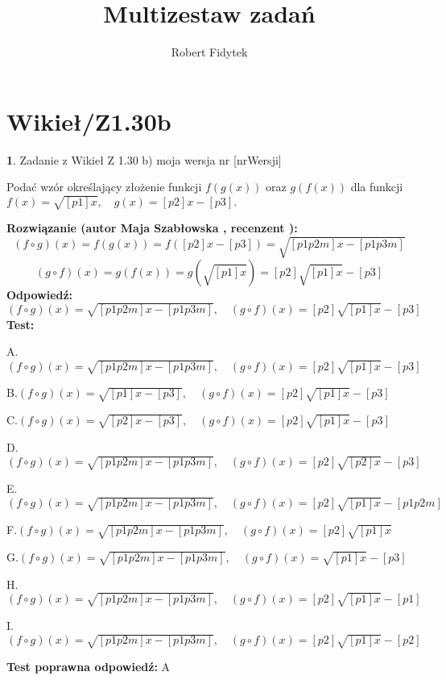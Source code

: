 \documentclass[12pt, a4paper]{article}
\title{Multizestaw zadań}
\author{Robert Fidytek}
\date{}
\theoremstyle{definition} %
\newtheorem{zad}{}
\newcommand{\kategoria}[1]{\section{#1}} %
\newcommand{\zadStart}[1]{\begin{zad}#1\newline} %
\newcommand{\zadStop}{\end{zad}}   %
\newcommand{\rozwStart}[2]{\noindent \textbf{Rozwiązanie (autor #1 , recenzent #2): }\newline} %
\newcommand{\rozwStop}{\newline}                                            %
\newcommand{\odpStart}{\noindent \textbf{Odpowiedź:}\newline}    %
\newcommand{\odpStop}{\newline}                                             %
\newcommand{\testStart}{\noindent \textbf{Test:}\newline} %
\newcommand{\testStop}{\newline} %
\newcommand{\kluczStart}{\noindent \textbf{Test poprawna odpowiedź:}\newline} %
\newcommand{\kluczStop}{\newline} %
\begin{document}
\maketitle


\kategoria{Wikieł/Z1.30b}
\zadStart{Zadanie z Wikieł Z 1.30 b)  moja wersja nr [nrWersji]}

Podać wzór określający złożenie funkcji $f(g(x))$ oraz $g(f(x))$ dla funkcji $f(x)=\sqrt{[p1]x},\quad g(x)=[p2]x-[p3].$
\zadStop
\rozwStart{Maja Szabłowska}{}
$$(f\circ g)(x)=f(g(x))=f([p2]x-[p3])=\sqrt{[p1p2m]x-[p1p3m]}$$
$$(g\circ f)(x)=g(f(x))=g(\sqrt{[p1]x})=[p2]\sqrt{[p1]x}-[p3]$$
\rozwStop
\odpStart
$(f\circ g)(x)=\sqrt{[p1p2m]x-[p1p3m]}, \quad (g\circ f)(x)=[p2]\sqrt{[p1]x}-[p3]$
\odpStop
\testStart

A.$(f\circ g)(x)=\sqrt{[p1p2m]x-[p1p3m]}, \quad (g\circ f)(x)=[p2]\sqrt{[p1]x}-[p3]$

B.$(f\circ g)(x)=\sqrt{[p1]x-[p3]}, \quad (g\circ f)(x)=[p2]\sqrt{[p1]x}-[p3]$

C.$(f\circ g)(x)=\sqrt{[p2]x-[p3]}, \quad (g\circ f)(x)=[p2]\sqrt{[p1]x}-[p3]$

D.$(f\circ g)(x)=\sqrt{[p1p2m]x-[p1p3m]}, \quad (g\circ f)(x)=[p2]\sqrt{[p2]x}-[p3]$

E.$(f\circ g)(x)=\sqrt{[p1p2m]x-[p1p3m]}, \quad (g\circ f)(x)=[p2]\sqrt{[p1]x}-[p1p2m]$

F.$(f\circ g)(x)=\sqrt{[p1p2m]x-[p1p3m]}, \quad (g\circ f)(x)=[p2]\sqrt{[p1]x}$

G.$(f\circ g)(x)=\sqrt{[p1p2m]x-[p1p3m]}, \quad (g\circ f)(x)=\sqrt{[p1]x}-[p3]$

H.$(f\circ g)(x)=\sqrt{[p1p2m]x-[p1p3m]}, \quad (g\circ f)(x)=[p2]\sqrt{[p1]x}-[p1]$

I.$(f\circ g)(x)=\sqrt{[p1p2m]x-[p1p3m]}, \quad (g\circ f)(x)=[p2]\sqrt{[p1]x}-[p2]$

\testStop
\kluczStart
A
\kluczStop
\end{document}

